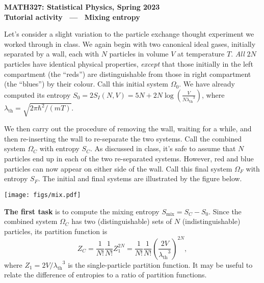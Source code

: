 \documentclass[12 pt]{article} %
\newcommand{\la}{\ensuremath{\lambda} }
\newcommand{\lath}{\ensuremath{\la_{\mathrm{th}}} }
\newcommand{\Om}{\ensuremath{\Omega} }
\begin{document}
\newcommand{\thisunit}{MATH327 Tutorial (Mixing)}
\newcommand{\moddate}{Last modified 15 Mar.~2023}
\begin{center}
  {\Large \textbf{MATH327: Statistical Physics, Spring 2023}} \\[12 pt]
  {\Large \textbf{Tutorial activity \ --- \ Mixing entropy}} \\[24 pt]
\end{center}

Let's consider a slight variation to the particle exchange thought experiment we worked through in class.
We again begin with two canonical ideal gases, initially separated by a wall, each with $N$ particles in volume $V$ at temperature $T$.
\textit{All} $2N$ particles have identical physical properties, \textit{except} that those initially in the left compartment (the ``reds'') are distinguishable from those in right compartment (the ``blues'') by their colour.
Call this initial system $\Om_0$.
We have already computed its entropy $S_0 = 2S_I(N, V) = 5N + 2N\log\left(\frac{V}{N\lath^3}\right)$, where $\lath = \sqrt{2\pi\hbar^2 / (mT)}$.

We then carry out the procedure of removing the wall, waiting for a while, and then re-inserting the wall to re-separate the two systems.
Call the combined system $\Om_C$ with entropy $S_C$.
As discussed in class, it's safe to assume that $N$ particles end up in each of the two re-separated systems.
However, red and blue particles can now appear on either side of the wall.
Call this final system $\Om_F$ with entropy $S_F$.
The initial and final systems are illustrated by the figure below.

\begin{center}\texttt{[image: figs/mix.pdf]}\end{center}

\textbf{The first task} is to compute the mixing entropy $S_{\text{mix}} = S_C - S_0$.
Since the combined system $\Om_C$ has two (distinguishable) sets of $N$ (indistinguishable) particles, its partition function is
\begin{equation*}
  Z_C = \frac{1}{N!} \frac{1}{N!} Z_1^{2N} = \frac{1}{N!} \frac{1}{N!} \left(\frac{2V}{\lath^3}\right)^{2N},
\end{equation*}
where $Z_1 = 2V / \lath^3$ is the single-particle partition function.
It may be useful to relate the difference of entropies to a ratio of partition functions.
\end{document}
